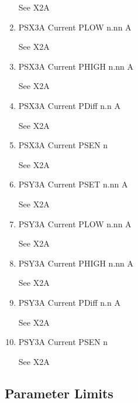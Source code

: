 \documentclass[11pt]{book}		%
\begin{document}
\begin{enumerate}
\color{red}
See X2A
\color{black}

 \item PSX3A Current PLOW  n.nn A

\color{red}
See X2A
\color{black}

 \item PSX3A Current PHIGH n.nn A

\color{red}
See X2A
\color{black}

 \item PSX3A Current PDiff n.n A

\color{red}
See X2A
\color{black}

 \item PSX3A Current PSEN  n

\color{red}
See X2A
\color{black}

 \item PSY3A Current PSET  n.nn A

\color{red}
See X2A
\color{black}

 \item PSY3A Current PLOW  n.nn A

\color{red}
See X2A
\color{black}

 \item PSY3A Current PHIGH n.nn A

\color{red}
See X2A
\color{black}

 \item PSY3A Current PDiff n.n A

\color{red}
See X2A
\color{black}

 \item PSY3A Current PSEN  n

\color{red}
See X2A
\color{black}

\end{enumerate}


\subsection{Parameter Limits} \label{sect:cyc-equip-ctl-beamline-sm23a-analog-control-limits}
\end{document}
